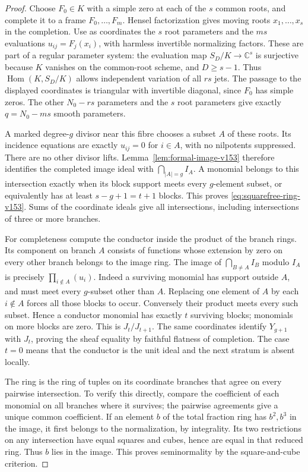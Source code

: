 \documentclass[11pt,reqno]{amsart}
\numberwithin{equation}{section}
\theoremstyle{definition}\newtheorem{definition}[theorem]{Definition}
\theoremstyle{remark}\newtheorem{remark}[theorem]{Remark}
\newcommand{\C}{\mathbb C}\newcommand{\Q}{\mathbb Q}
\DeclareMathOperator{\Hom}{Hom}\DeclareMathOperator{\Tot}{Tot}
\begin{document}
\begin{proof}
Choose $F_0\in K$ with a simple zero at each of the $s$ common roots,
and complete it to a frame $F_0,\ldots,F_m$. Hensel factorization gives
moving roots $x_1,\ldots,x_s$ in the completion. Use as coordinates
the $s$ root parameters and the $ms$ evaluations
$u_{ij}=F_j(x_i)$, with harmless invertible normalizing factors.
These are part of a regular parameter system: the evaluation map
$S_D/K\to\C^s$ is surjective because $K$ vanishes on the common-root
scheme, and $D\geq s-1$. Thus
$\Hom(K,S_D/K)$ allows independent variation of all $rs$ jets.
The passage to the displayed coordinates is triangular with invertible
diagonal, since $F_0$ has simple zeros. The other $N_0-rs$ parameters
and the $s$ root parameters give exactly $q=N_0-ms$ smooth parameters.

A marked degree-$g$ divisor near this fibre chooses a subset $A$ of
these roots. Its incidence equations are exactly $u_{ij}=0$ for
$i\in A$, with no nilpotents suppressed. There are no other divisor
lifts. Lemma~\ref{lem:formal-image-v153} therefore identifies the
completed image ideal with $\bigcap_{|A|=g}I_A$. A monomial belongs
to this intersection exactly when its block support meets every
$g$-element subset, or equivalently has at least $s-g+1=t+1$ blocks.
This proves \eqref{eq:squarefree-ring-v153}. Sums of the coordinate
ideals give all intersections, including intersections of three or
more branches.

For completeness compute the conductor inside the product of the
branch rings. Its component on branch $A$ consists of functions whose
extension by zero on every other branch belongs to the image ring.
The image of $\bigcap_{B\ne A}I_B$ modulo $I_A$ is precisely
$\prod_{i\notin A}(u_i)$. Indeed a surviving monomial has support
outside $A$, and must meet every $g$-subset other than $A$. Replacing
one element of $A$ by each $i\notin A$ forces all those blocks to
occur. Conversely their product meets every such subset. Hence a
conductor monomial has exactly $t$ surviving blocks; monomials on more
blocks are zero. This is $J_t/J_{t+1}$. The same coordinates identify
$Y_{g+1}$ with $J_t$, proving the sheaf equality by faithful flatness
of completion. The case $t=0$ means that the conductor is the unit
ideal and the next stratum is absent locally.

The ring is the ring of tuples on its coordinate branches that agree
on every pairwise intersection. To verify this directly, compare the
coefficient of each monomial on all branches where it survives; the
pairwise agreements give a unique common coefficient. If an element
$b$ of the total fraction ring has $b^2,b^3$ in the image, it first
belongs to the normalization, by integrality. Its two restrictions
on any intersection have equal squares and cubes, hence are equal
in that reduced ring. Thus $b$ lies in the image. This proves
seminormality by the square-and-cube criterion.


\end{proof}
\end{document}
